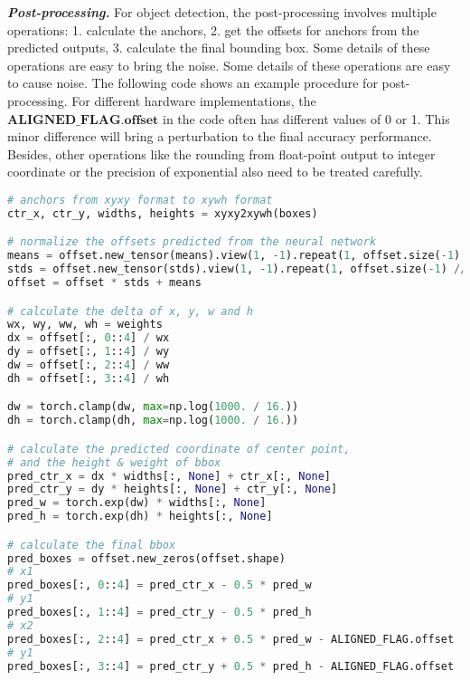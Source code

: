 \textbf{\emph{Post-processing. }}
For object detection, the post-processing involves multiple operations: 1. calculate the anchors, 2. get the offsets for anchors from the predicted outputs, 3. calculate the final bounding box. Some details of these operations are easy to bring the noise. Some details of these operations are easy to cause noise. The following code shows an example procedure for post-processing. For different hardware implementations, the $\mathbf{ALIGNED\_FLAG.offset}$ in the code often has different values of 0 or 1. This minor difference will bring a perturbation to the final accuracy performance. Besides, other operations like the rounding from float-point output to integer coordinate or the precision of exponential also need to be treated carefully.

\begin{lstlisting}[language=python,basicstyle=\ttfamily, breaklines=true]
# anchors from xyxy format to xywh format
ctr_x, ctr_y, widths, heights = xyxy2xywh(boxes)

# normalize the offsets predicted from the neural network
means = offset.new_tensor(means).view(1, -1).repeat(1, offset.size(-1) // 4)
stds = offset.new_tensor(stds).view(1, -1).repeat(1, offset.size(-1) // 4)
offset = offset * stds + means

# calculate the delta of x, y, w and h
wx, wy, ww, wh = weights
dx = offset[:, 0::4] / wx
dy = offset[:, 1::4] / wy
dw = offset[:, 2::4] / ww
dh = offset[:, 3::4] / wh

dw = torch.clamp(dw, max=np.log(1000. / 16.))
dh = torch.clamp(dh, max=np.log(1000. / 16.))

# calculate the predicted coordinate of center point, 
# and the height & weight of bbox
pred_ctr_x = dx * widths[:, None] + ctr_x[:, None]
pred_ctr_y = dy * heights[:, None] + ctr_y[:, None]
pred_w = torch.exp(dw) * widths[:, None]
pred_h = torch.exp(dh) * heights[:, None]

# calculate the final bbox
pred_boxes = offset.new_zeros(offset.shape)
# x1
pred_boxes[:, 0::4] = pred_ctr_x - 0.5 * pred_w
# y1
pred_boxes[:, 1::4] = pred_ctr_y - 0.5 * pred_h
# x2
pred_boxes[:, 2::4] = pred_ctr_x + 0.5 * pred_w - ALIGNED_FLAG.offset
# y1
pred_boxes[:, 3::4] = pred_ctr_y + 0.5 * pred_h - ALIGNED_FLAG.offset
\end{lstlisting}



